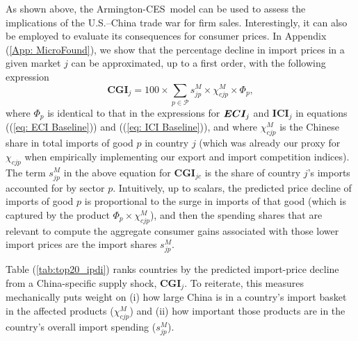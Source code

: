 \documentclass[english,12pt]{article}
\theoremstyle{definition}
\let\oldref\ref
\renewcommand{\ref}[1]{(\oldref{#1})}
\begin{document}
As shown above, the Armington-CES\ model can be used to
assess the implications of the U.S.--China trade war for firm sales.
Interestingly, it can also be employed to evaluate its consequences for
consumer prices. In Appendix \ref{App: MicroFound}, we show that the percentage decline in import
prices in a given market $j$ can be approximated, up to a first
order, with the following expression%
\begin{equation}
\boldsymbol{CGI}_{j}= 100 \times \sum_{p\in \mathcal{P}} s_{jp}^{M}\times \chi
_{cjp}^{M}\times \Phi _{p},
\label{eq:CGI}
\end{equation}%
where $\Phi _{p}$ is identical to that in the expressions for $\boldsymbol{%
ECI}_{j}$ and $\boldsymbol{ICI}_{j}$ in equations (\ref{eq: ECI Baseline})
and (\ref{eq: ICI Baseline}), and where $\chi _{cjp}^{M}$ is the Chinese
share in total imports of good $p$ in country $j$ (which was already our
proxy for $\chi _{cjp}$ when empirically implementing our export and import competition
indices). The term $s_{jp}^{M}$ in the above equation for $\boldsymbol{CGI}%
_{jc}$ is the share of country $j$'s imports accounted for by sector $p$.
Intuitively, up to scalars, the predicted price decline of imports of good $p
$ is proportional to the surge in imports of that good (which is captured
by the product $\Phi _{p}\times \chi _{cjp}^{M}$), and then the spending shares that are
relevant to compute the aggregate consumer gains associated with those lower
import prices are the import shares $s_{jp}^{M}$.

Table \ref{tab:top20_ipdi} ranks countries by the predicted import-price decline from a China-specific supply shock, $\boldsymbol{CGI}_{j}$. To reiterate, this measures mechanically puts weight on (i) how large China is in a country's import basket in the affected products ($\chi^{M}_{cjp}$) and (ii) how important those products are in the country's overall import spending ($s^{M}_{jp}$). 


\begin{table}[htbp]
\caption{Top 20 economies by Consumer Gains Index ($\boldsymbol{CGI}_{j}$)}
\label{tab:top20_ipdi}\centering

\end{table}
\end{document}
